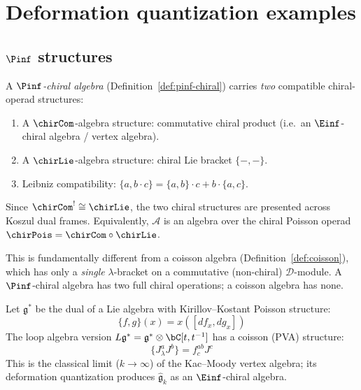 
\chapter{Deformation quantization examples}
\label{chap:deformation-examples}



\section{\texorpdfstring{$\Pinf$ structures}{Pinf structures}}
\label{sec:pinf-structures}
\begin{definition}\label{def:pinf-chiral-detailed}
A \emph{$\Pinf$-chiral algebra} (Definition~\ref{def:pinf-chiral}) carries
\emph{two} compatible chiral-operad structures:
\begin{enumerate}[label=(\roman*)]
\item A $\chirCom$-algebra structure: commutative chiral product (i.e.\
  an $\Einf$-chiral algebra / vertex algebra).
\item A $\chirLie$-algebra structure: chiral Lie bracket $\{-, -\}$.
\item Leibniz compatibility: $\{a, b \cdot c\} = \{a, b\} \cdot c + b \cdot \{a, c\}$.
\end{enumerate}
Since ${\chirCom}^! \cong \chirLie$, the two chiral structures are
presented across Koszul dual frames.
Equivalently, $\mathcal{A}$ is an algebra over the chiral Poisson operad
$\chirPois = \chirCom \circ \chirLie$.

This is fundamentally different from a coisson algebra
(Definition~\ref{def:coisson}), which has only a \emph{single}
$\lambda$-bracket on a commutative (non-chiral) $\mathcal{D}$-module.
A $\Pinf$-chiral algebra has two full chiral operations; a coisson algebra
has none.
\end{definition}

\begin{example}\label{ex:classical-affine}
Let $\mathfrak{g}^*$ be the dual of a Lie algebra with Kirillov--Kostant Poisson structure:
\[
\{f, g\}(x) = x([df_x, dg_x])
\]
The loop algebra version $L\mathfrak{g}^* = \mathfrak{g}^* \otimes \bC[t, t^{-1}]$ has a
coisson (PVA) structure:
\[
\{J^a_\lambda J^b\} = f^{ab}_c J^c
\]
This is the classical limit ($k \to \infty$) of the Kac--Moody vertex algebra;
its deformation quantization produces $\hat{\mathfrak{g}}_k$ as an $\Einf$-chiral
algebra.
\end{example}


